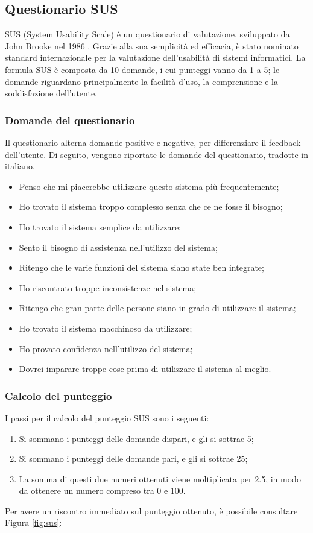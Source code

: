 \subsection{Questionario SUS}
SUS (System Usability Scale) è un questionario di valutazione, sviluppato da John Brooke nel 1986 \cite{sussurvey}.
Grazie alla sua semplicità ed efficacia, è stato nominato standard internazionale per la valutazione dell'usabilità di sistemi informatici.
La formula SUS è composta da 10 domande, i cui punteggi vanno da 1 a 5; le domande riguardano principalmente la facilità d'uso, la comprensione e la soddisfazione dell'utente.

\newpage

\subsubsection{Domande del questionario}
Il questionario alterna domande positive e negative, per differenziare il feedback dell'utente.
Di seguito, vengono riportate le domande del questionario, tradotte in italiano.
\begin{itemize}
  \item Penso che mi piacerebbe utilizzare questo sistema più frequentemente;
  \item Ho trovato il sistema troppo complesso senza che ce ne fosse il bisogno;
  \item Ho trovato il sistema semplice da utilizzare;
  \item Sento il bisogno di assistenza nell'utilizzo del sistema;
  \item Ritengo che le varie funzioni del sistema siano state ben integrate;
  \item Ho riscontrato troppe inconsistenze nel sistema;
  \item Ritengo che gran parte delle persone siano in grado di utilizzare il sistema;
  \item Ho trovato il sistema macchinoso da utilizzare;
  \item Ho provato confidenza nell'utilizzo del sistema;
  \item Dovrei imparare troppe cose prima di utilizzare il sistema al meglio.
\end{itemize}

\subsubsection{Calcolo del punteggio}
I passi per il calcolo del punteggio SUS sono i seguenti:
\begin{enumerate}
  \item Si sommano i punteggi delle domande dispari, e gli si sottrae 5;
  \item Si sommano i punteggi delle domande pari, e gli si sottrae 25;
  \item La somma di questi due numeri ottenuti viene moltiplicata per 2.5, in modo da ottenere un numero compreso tra 0 e 100.
\end{enumerate}
Per avere un riscontro immediato sul punteggio ottenuto, è possibile consultare Figura \ref{fig:sus}:

